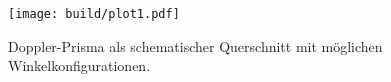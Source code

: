 \begin{figure}
    \centering
    \texttt{[image: build/plot1.pdf]}
    \caption{Doppler-Prisma als schematischer Querschnitt mit möglichen Winkelkonfigurationen. \cite{skript}} 
    \label{fig:figskizze1}
\end{figure}